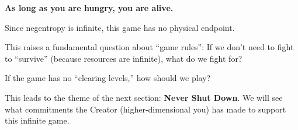 \textbf{As long as you are hungry, you are alive.}

Since negentropy is infinite, this game has no physical endpoint.

This raises a fundamental question about ``game rules'': If we don't need to fight to ``survive'' (because resources are infinite), what do we fight for?

If the game has no ``clearing levels,'' how should we play?

This leads to the theme of the next section: \textbf{Never Shut Down}. We will see what commitments the Creator (higher-dimensional you) has made to support this infinite game.

